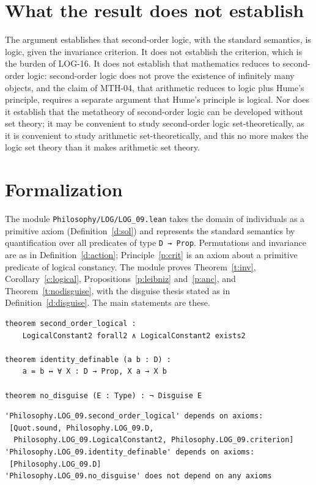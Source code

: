 \documentclass{situationist-preprint}
\begin{document}
\section{What the result does not establish}

The argument establishes that second-order logic, with the standard semantics, is logic, given the invariance criterion. It does not establish the criterion, which is the burden of LOG-16. It does not establish that mathematics reduces to second-order logic: second-order logic does not prove the existence of infinitely many objects, and the claim of MTH-04, that arithmetic reduces to logic plus Hume's principle, requires a separate argument that Hume's principle is logical. Nor does it establish that the metatheory of second-order logic can be developed without set theory; it may be convenient to study second-order logic set-theoretically, as it is convenient to study arithmetic set-theoretically, and this no more makes the logic set theory than it makes arithmetic set theory.

\section{Formalization}

The module \nolinkurl{Philosophy/LOG/LOG_09.lean} takes the domain of individuals as a primitive axiom (Definition~\ref{d:sol}) and represents the standard semantics by quantification over all predicates of type \texttt{D → Prop}. Permutations and invariance are as in Definition~\ref{d:action}; Principle~\ref{p:crit} is an axiom about a primitive predicate of logical constancy. The module proves Theorem~\ref{t:inv}, Corollary~\ref{c:logical}, Propositions~\ref{p:leibniz} and~\ref{p:anc}, and Theorem~\ref{t:nodisguise}, with the disguise thesis stated as in Definition~\ref{d:disguise}. The main statements are these.

\begin{lstlisting}
theorem second_order_logical :
    LogicalConstant2 forall2 ∧ LogicalConstant2 exists2

theorem identity_definable (a b : D) :
    a = b ↔ ∀ X : D → Prop, X a → X b

theorem no_disguise (E : Type) : ¬ Disguise E
\end{lstlisting}

\begin{lstlisting}
'Philosophy.LOG_09.second_order_logical' depends on axioms:
 [Quot.sound, Philosophy.LOG_09.D,
  Philosophy.LOG_09.LogicalConstant2, Philosophy.LOG_09.criterion]
'Philosophy.LOG_09.identity_definable' depends on axioms:
 [Philosophy.LOG_09.D]
'Philosophy.LOG_09.no_disguise' does not depend on any axioms
\end{lstlisting}
\end{document}
